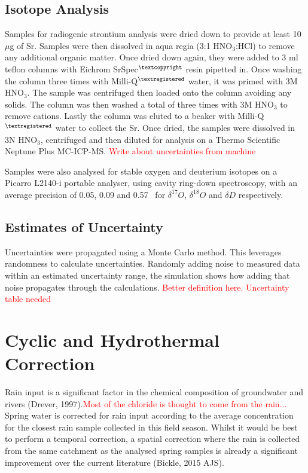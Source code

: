 \subsection{Isotope Analysis}

Samples for radiogenic strontium analysis were dried down to provide at least 10 $\mu$g of Sr. Samples were then dissolved in aqua regia (3:1 HNO$_3$:HCl) to remove any additional organic matter. Once dried down again, they were added to 3 ml teflon columns with Eichrom SrSpec$^{\textcopyright}$ resin pipetted in. Once washing the column three times with Milli-Q$^{\textregistered}$ water, it was primed with 3M HNO$_3$. The sample was centrifuged then loaded onto the column avoiding any solids. The column was then washed a total of three times with 3M HNO$_3$ to remove cations. Lastly the column was eluted to a beaker with Milli-Q$^{\textregistered}$ water to collect the Sr. Once dried, the samples were dissolved in 3N HNO$_3$, centrifuged and then diluted for analysis on a Thermo Scientific Neptune Plus MC-ICP-MS. \textcolor{red}{Write about uncertainties from machine}

\bsk

Samples were also analysed for stable oxygen and deuterium isotopes on a Picarro L2140-i portable analyser, using cavity ring-down spectroscopy, with an average precision of 0.05, 0.09 and 0.57 \textperthousand\ for $\delta^{17}O$, $\delta^{18}O$ and $\delta D$ respectively. 


\subsection{Estimates of Uncertainty}

Uncertainties were propagated using a Monte Carlo method. This leverages randomness to calculate uncertainties. Randomly adding noise to measured data within an estimated uncertainty range, the simulation shows how adding that noise propagates through the calculations. \textcolor{red}{Better definition here. Uncertainty table needed}

\newpage


\section{Cyclic and Hydrothermal Correction}

Rain input is a significant factor in the chemical composition of groundwater and rivers (Drever, 1997).\textcolor{red}{Most of the chloride is thought to come from the rain...} Spring water is corrected for rain input according to the average concentration for the closest rain sample collected in this field season. Whilst it would be best to perform a temporal correction, a spatial correction where the rain is collected from the same catchment as the analysed spring samples is already a significant improvement over the current literature (Bickle, 2015 AJS).

